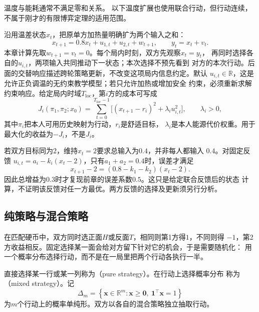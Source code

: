 温度与能耗通常不满足零和关系。
以下温度扩展也使用联合行动，但行动连续，不属于刚才的有限博弈定理的适用范围。

\begin{example}[两方共同加热的状态与成本]
\label{ex:game-two-heaters}
沿用温差状态\(x_t\)，把原单方加热量明确扩为两个输入之和：
\begin{equation}
  x_{t+1}=0.8x_t+u_{1,t}+u_{2,t}+w_{t+1},
  \qquad y_t=x_t+v_t.
  \label{eq:game-two-heater-dynamics}
\end{equation}
本章计算先取\(w_{t+1}=v_t=0\)。每个局内时刻，双方先观察\(x_t=y_t\)，
再同时选择各自的\(u_{i,t}\)，两项输入共同推动下一状态；本次选择不预先看到
对方的本次行动。后面的交替响应描述跨轮策略更新，不改变这项局内信息约定。默认
\(u_{i,t}\in\mathbb R\)，这是允许正负调温的无约束教学模型；若只允许加热或增加安全
约束，必须重新求解约束响应。给定局内时域\(T_{\mathrm{loc}}\)，第\(i\)方的成本可写成
\[
  J_i(\pi_1,\pi_2;x_0)
  =\sum_{t=0}^{T_{\mathrm{loc}}-1}
  \bigl[(x_{t+1}-r_i)^2+\lambda_i u_{i,t}^2\bigr],
  \qquad \lambda_i>0,
\]
其中\(\pi_i\)把本人可用历史映射为行动，\(r_i\)是舒适目标，
\(\lambda_i\)是本人能源代价权重。用于最大化的收益为\(-J_i\)，不是\(J_i\)。
\end{example}

若双方目标同为\(2\)，维持\(x_t=2\)要求总输入为\(0.4\)，并非每人都输入
\(0.4\)。对固定反馈
\(u_{i,t}=a_i-k_i(x_t-2)\)，只有\(a_1+a_2=0.4\)时，误差才满足
\[
  x_{t+1}-2=(0.8-k_1-k_2)(x_t-2).
\]
因此总增益为\(0.3\)时才复现前章的误差系数\(0.5\)。这只是给定联合反馈后的状态
计算，不证明该反馈对任一方最优。两方反馈的选择及更新须另行分析。

\subsection{纯策略与混合策略}
\label{sec:game-pure-mixed}

在匹配硬币中，双方同时选正面\(H\)或反面\(T\)，相同则第1方得\(1\)，不同则得
\(-1\)，第2方收益相反。固定选择某一面会给对方留下针对它的机会，于是需要随机化：
用一个概率分布选择行动，而不是在一局里把两个行动各执行一半。
\begin{definition}[纯策略与混合策略]
\label{def:game-pure-mixed-strategy}
直接选择某一行或某一列称为（pure strategy）。在行动上选择概率分布
称为（mixed strategy）。记
\[
  \Delta_m
  =
  \left\{
    \bm{x}\in\mathbb{R}^m:
    \bm{x}\geq\bm{0},\
    \bm{1}^{\top}\bm{x}=1
  \right\}
\]
为\(m\)个行动上的概率单纯形。双方以各自的混合策略独立抽取行动。
\end{definition}

